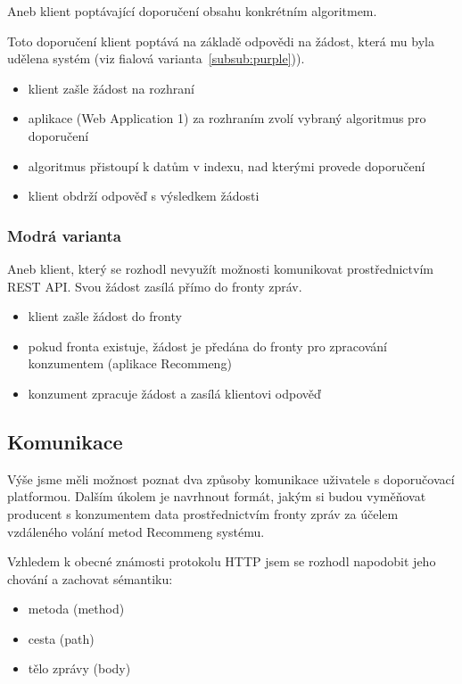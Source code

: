 \documentclass[thesis=M,czech]{FITthesis}[2014/05/07]
\begin{document}
Aneb klient poptávající doporučení obsahu konkrétním algoritmem.

Toto doporučení klient poptává na základě odpovědi na žádost, která mu byla udělena systém (viz fialová varianta~\ref{subsub:purple})). 

\begin{itemize}
	\item klient zašle žádost na rozhraní
	\item aplikace (Web Application 1) za rozhraním zvolí vybraný algoritmus pro doporučení
	\item algoritmus přistoupí k datům v indexu, nad kterými provede doporučení
	\item klient obdrží odpověď s výsledkem žádosti
\end{itemize}

\subsubsection{Modrá varianta}

Aneb klient, který se rozhodl nevyužít možnosti komunikovat prostřednictvím REST API. Svou žádost zasílá přímo do fronty zpráv.

\begin{itemize}
	\item klient zašle žádost do fronty
	\item pokud fronta existuje, žádost je předána do fronty pro zpracování konzumentem (aplikace Recommeng)
	\item konzument zpracuje žádost a zasílá klientovi odpověď
\end{itemize}

\subsection{Komunikace}

Výše jsme měli možnost poznat dva způsoby komunikace uživatele s doporučovací platformou. Dalším úkolem je navrhnout formát, jakým si budou vyměňovat producent s konzumentem data prostřednictvím fronty zpráv za účelem vzdáleného volání metod Recommeng systému.

Vzhledem k obecné známosti protokolu HTTP jsem se rozhodl napodobit jeho chování a zachovat sémantiku:

\begin{itemize}
	\item metoda (method)
	\item cesta (path)
	\item tělo zprávy (body)
\end{itemize}
\end{document}
